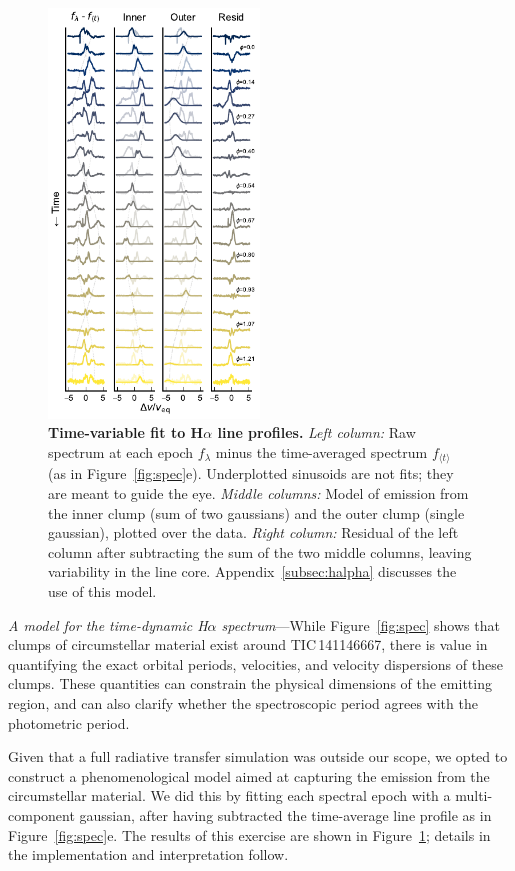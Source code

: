 \documentclass[11pt,twocolumn,tighten]{aastex7}
\begin{document}
\begin{figure}[!tp]
  \centering
  \includegraphics[width=0.5\textwidth]{f6.pdf}
  \caption{{\bf Time-variable fit to H$\alpha$ line profiles.}  {\it Left
  column:} Raw spectrum at each epoch $f_{\lambda}$ minus the
  time-averaged spectrum $f_{\langle t \rangle}$ (as in
  Figure~\ref{fig:spec}e).  Underplotted sinusoids are not fits; they
  are meant to guide the eye.  {\it Middle columns:} Model of emission
  from the inner clump (sum of two gaussians) and the outer clump
  (single gaussian), plotted over the data.  {\it Right column:}
  Residual of the left column after subtracting the sum of the two
  middle columns, leaving variability in the line core.
  Appendix~\ref{subsec:halpha} discusses the use of this model.  }
  \label{fig:halphamodel}
\end{figure}

{\it A model for the time-dynamic H$\alpha$ spectrum}---While
Figure~\ref{fig:spec} shows that clumps of circumstellar material
exist around TIC\,141146667, there is value in quantifying the exact
orbital periods, velocities, and velocity dispersions of these clumps.
These quantities can constrain the physical dimensions of the emitting
region, and can also clarify whether the spectroscopic period agrees
with the photometric period.

Given that a full radiative transfer simulation was outside our scope,
we opted to construct a phenomenological model aimed at capturing the
emission from the circumstellar material.  We did this by fitting each
spectral epoch with a multi-component gaussian, after having
subtracted the time-average line profile as in Figure~\ref{fig:spec}e.
The results of this exercise are shown in
Figure~\ref{fig:halphamodel}; details in the implementation and
interpretation follow.
\end{document}
